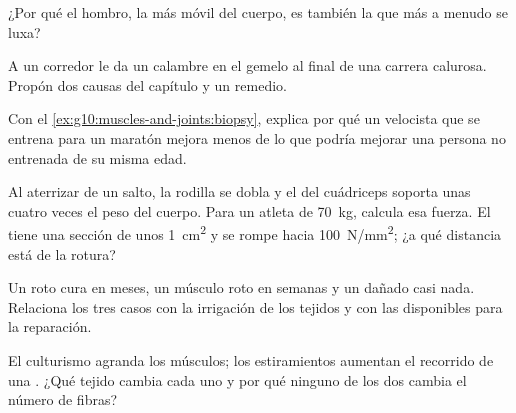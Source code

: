 \begin{exercise}[$\star\star$]\label{exo:g10:muscles-and-joints:9}
¿Por qué el hombro, la  más móvil del cuerpo, es también la
que más a menudo se luxa?
\end{exercise}

\begin{exercise}[$\star\star$]\label{exo:g10:muscles-and-joints:10}
A un corredor le da un calambre en el gemelo al final de una carrera
calurosa. Propón dos causas del capítulo y un remedio.
\end{exercise}

\begin{exercise}[$\star\star$]\label{exo:g10:muscles-and-joints:11}
Con el \cref{ex:g10:muscles-and-joints:biopsy}, explica por qué un
velocista que se entrena para un maratón mejora menos de lo que podría
mejorar una persona no entrenada de su misma edad.
\end{exercise}

\begin{exercise}[$\star\star\star$]\label{exo:g10:muscles-and-joints:12}
Al aterrizar de un salto, la rodilla se dobla y el  del
cuádriceps soporta unas cuatro veces el peso del cuerpo. Para un atleta
de \qty{70}{kg}, calcula esa fuerza. El  tiene una sección de
unos \qty{1}{cm^2} y se rompe hacia \qty{100}{N/mm^2}; ¿a qué distancia
está de la rotura?
\end{exercise}

\begin{exercise}[$\star\star\star$]\label{exo:g10:muscles-and-joints:13}
Un  roto cura en meses, un músculo roto en semanas y un
 dañado casi nada. Relaciona los tres casos con la irrigación
de los tejidos y con las  disponibles para la reparación.
\end{exercise}

\begin{exercise}[$\star\star\star$]\label{exo:g10:muscles-and-joints:14}
El culturismo agranda los músculos; los estiramientos aumentan el
recorrido de una . ¿Qué tejido cambia cada uno y por qué
ninguno de los dos cambia el número de fibras?
\end{exercise}

